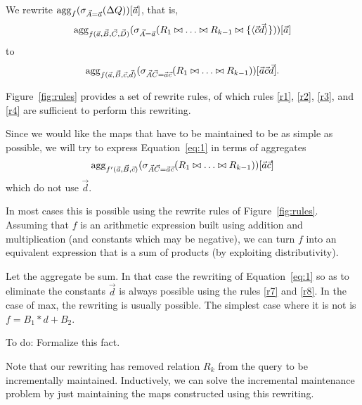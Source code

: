 We rewrite
$
\mathrm{agg}_f(\sigma_{\vec{A}=\vec{a}}(\Delta Q))[\vec{a}]
$, that is,
\[
\mathrm{agg}_{f(\vec{a}, \vec{B}, \vec{C}, \vec{D})}
(\sigma_{\vec{A}=\vec{a}}(R_1 \bowtie \dots \bowtie R_{k-1} \bowtie \{{\langle\vec{c}\vec{d}\rangle}\}))[\vec{a}]
\]
to
\begin{equation}
\mathrm{agg}_{f(\vec{a}, \vec{B}, \vec{c}, \vec{d})}
(\sigma_{\vec{A}\vec{C}=\vec{a}\vec{c}}(R_1 \bowtie \dots \bowtie R_{k-1}))[\vec{a}\vec{c}\vec{d}].
\label{eq:1}
\end{equation}

Figure~\ref{fig:rules} provides a set of rewrite rules, of which rules
\ref{r1}, \ref{r2}, \ref{r3}, and \ref{r4} are sufficient to  perform this
rewriting.

Since we would like the maps that have to be maintained to be as simple as
possible, we will try to express Equation~\ref{eq:1} in terms of 
aggregates
\begin{equation}
\mathrm{agg}_{f'(\vec{a}, \vec{B}, \vec{c})}
(\sigma_{\vec{A}\vec{C}=\vec{a}\vec{c}}(R_1 \bowtie \dots \bowtie R_{k-1}))[\vec{a}\vec{c}]
\label{eq:2}
\end{equation}
which do not use $\vec{d}$.

In most cases
this is possible using the rewrite rules of Figure~\ref{fig:rules}.
Assuming that $f$ is an arithmetic expression built using addition and multiplication (and constants which may be negative), we can turn $f$ into an equivalent
expression that is a sum of products (by exploiting distributivity).

Let the aggregate be sum. In that case the rewriting of Equation~\ref{eq:1}
so as to eliminate the constants $\vec{d}$
is always possible using the rules \ref{r7} and \ref{r8}.
In the case of max, the rewriting is usually possible. The simplest case
where it is not is $f = B_1 * d + B_2$.


\begin{proposition}
To do: Formalize this fact.
\end{proposition}


Note that our rewriting has removed relation $R_k$ from the query to be
incrementally maintained. Inductively, we can solve the incremental maintenance
problem by just maintaining the maps constructed using this rewriting.


